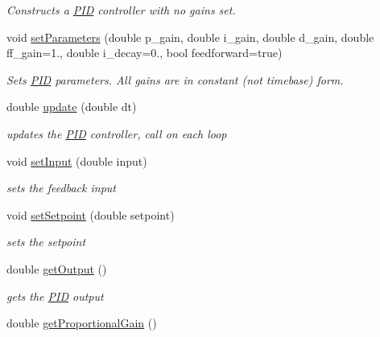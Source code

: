 \begin{DoxyCompactItemize}
\begin{DoxyCompactList}\small\item\em Constructs a \hyperlink{class_rhesus_1_1_toolkit_1_1_control_1_1_p_i_d}{P\-I\-D} controller with no gains set. \end{DoxyCompactList}\item 
void \hyperlink{class_rhesus_1_1_toolkit_1_1_control_1_1_p_i_d_a1fbc821c8f5ad0ccb66911e21dc25283}{set\-Parameters} (double p\-\_\-gain, double i\-\_\-gain, double d\-\_\-gain, double ff\-\_\-gain=1., double i\-\_\-decay=0., bool feedforward=true)
\begin{DoxyCompactList}\small\item\em Sets \hyperlink{class_rhesus_1_1_toolkit_1_1_control_1_1_p_i_d}{P\-I\-D} parameters. All gains are in constant (not timebase) form. \end{DoxyCompactList}\item 
double \hyperlink{class_rhesus_1_1_toolkit_1_1_control_1_1_p_i_d_a0c394d229031c585a76f7488f94cd5cb}{update} (double dt)
\begin{DoxyCompactList}\small\item\em updates the \hyperlink{class_rhesus_1_1_toolkit_1_1_control_1_1_p_i_d}{P\-I\-D} controller, call on each loop \end{DoxyCompactList}\item 
void \hyperlink{class_rhesus_1_1_toolkit_1_1_control_1_1_p_i_d_abcf5b67ca37d758eb305bddaf5c946dc}{set\-Input} (double input)
\begin{DoxyCompactList}\small\item\em sets the feedback input \end{DoxyCompactList}\item 
void \hyperlink{class_rhesus_1_1_toolkit_1_1_control_1_1_p_i_d_a73844627f25d622723ac8f77ed7912da}{set\-Setpoint} (double setpoint)
\begin{DoxyCompactList}\small\item\em sets the setpoint \end{DoxyCompactList}\item 
double \hyperlink{class_rhesus_1_1_toolkit_1_1_control_1_1_p_i_d_ae0f84ab82896e8a66839454d6ed53a99}{get\-Output} ()
\begin{DoxyCompactList}\small\item\em gets the \hyperlink{class_rhesus_1_1_toolkit_1_1_control_1_1_p_i_d}{P\-I\-D} output \end{DoxyCompactList}\item 
double \hyperlink{class_rhesus_1_1_toolkit_1_1_control_1_1_p_i_d_af168072b520a39402b41da6107080e01}{get\-Proportional\-Gain} ()

\end{DoxyCompactItemize}
